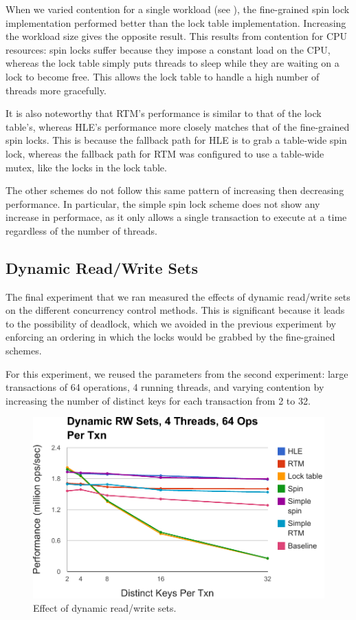 When we varied contention for a single workload (see ), the
fine-grained spin lock implementation performed better than the lock table
implementation. Increasing the workload size gives the opposite result. This
results from contention for CPU resources: spin locks suffer because they impose
a constant load on the CPU, whereas the lock table simply puts threads to sleep
while they are waiting on a lock to become free. This allows the lock table to
handle a high number of threads more gracefully.

It is also noteworthy that RTM's performance is similar to that of the lock
table's, whereas HLE's performance more closely matches that of the fine-grained
spin locks.  This is because the fallback path for HLE is to grab a table-wide
spin lock, whereas the fallback path for RTM was configured to use a table-wide
mutex, like the locks in the lock table.

The other schemes do not follow this same pattern of increasing then decreasing
performance. In particular, the simple spin lock scheme does not show any
increase in performace, as it only allows a single transaction to execute at a
time regardless of the number of threads.

\subsection{Dynamic Read/Write Sets}

The final experiment that we ran measured the effects of dynamic read/write sets
on the different concurrency control methods. This is significant because it
leads to the possibility of deadlock, which we avoided in the previous
experiment by enforcing an ordering in which the locks would be grabbed by the
fine-grained schemes.

For this experiment, we reused the parameters from the second experiment:
large transactions of 64 operations, 4 running threads, and varying 
contention by increasing the number of distinct keys for each transaction 
from 2 to 32.

\begin{figure}[h!]
  \centering
  \includegraphics[scale=0.575]{figure/dynamic.pdf}
  \caption{Effect of dynamic read/write sets.}
  \label{fig:dynamic} 
\end{figure}

